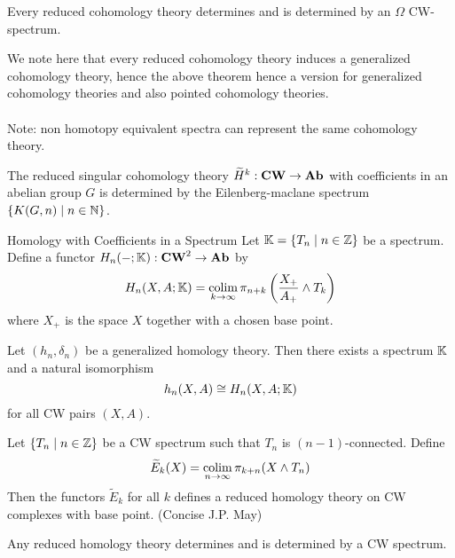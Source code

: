 \documentclass[a4paper]{article}
\begin{document}
\begin{thm}{}{} Every reduced cohomology theory determines and is determined by an $\Omega$ CW-spectrum. 
\end{thm}

We note here that every reduced cohomology theory induces a generalized cohomology theory, hence the above theorem hence a version for generalized cohomology theories and also pointed cohomology theories. \\~\\

Note: non homotopy equivalent spectra can represent the same cohomology theory. 

\begin{thm}{}{} The reduced singular cohomology theory $\widetilde{H}^k:\bold{CW}\to\bold{Ab}$ with coefficients in an abelian group $G$ is determined by the Eilenberg-maclane spectrum $\{K(G,n)\;|\;n\in\mathbb{N}\}$. 
\end{thm}

\begin{defn}{Homology with Coefficients in a Spectrum}{} Let $\mathbb{K}=\{T_n\;|\;n\in\mathbb{Z}\}$ be a spectrum. Define a functor $H_n(-;\mathbb{K}):\bold{CW}^2\to\bold{Ab}$ by $$H_n(X,A;\mathbb{K})=\operatorname*{colim}_{k\to\infty}\pi_{n+k}\left(\frac{X_+}{A_+}\wedge T_k\right)$$ where $X_+$ is the space $X$ together with a chosen base point. 
\end{defn}

\begin{thm}{}{} Let $(h_n,\delta_n)$ be a generalized homology theory. Then there exists a spectrum $\mathbb{K}$ and a natural isomorphism $$h_n(X,A)\cong H_n(X,A;\mathbb{K})$$ for all CW pairs $(X,A)$. 
\end{thm}

\begin{thm}{}{} Let $\{T_n\;|\;n\in\mathbb{Z}\}$ be a CW spectrum such that $T_n$ is $(n-1)$-connected. Define $$\widetilde{E}_k(X)=\operatorname*{colim}_{n\to\infty}\pi_{k+n}(X\wedge T_n)$$ Then the functors $\widetilde{E}_k$ for all $k$ defines a reduced homology theory on CW complexes with base point. (Concise J.P. May)
\end{thm}

\begin{thm}{}{} Any reduced homology theory determines and is determined by a CW spectrum. 
\end{thm}
\end{document}
